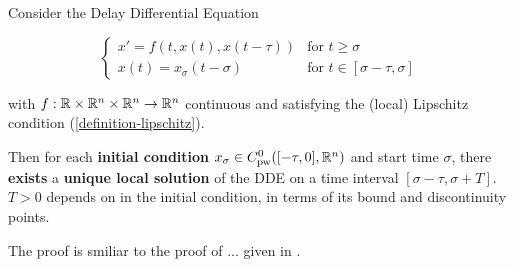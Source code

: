\documentclass[10pt]{article}
\begin{document}
\begin{theorem}
    \label{theorem-solution-existence}
    Consider the Delay Differential Equation



    \begin{equation}
        \begin{cases}
            x' = f(t,x(t),x(t-\tau)) & \text{for } t\geq\sigma\\
            x(t) = x_\sigma(t-\sigma)     & \text{for } t\in [\sigma-\tau,\sigma]
        \end{cases}
    \end{equation}

    with $f:\mathbb{R}\times\mathbb{R}^n\times\mathbb{R}^n\rightarrow\mathbb{R}^n$ continuous and satisfying the (local) Lipschitz condition (\ref{definition-lipschitz}).

    Then for each \textbf{initial condition} $x_\sigma\in C^0_\text{pw}([-\tau,0],\mathbb{R}^n)$ and start time $\sigma$, there \textbf{exists} a \textbf{unique local solution} of the DDE on a time interval $[\sigma-\tau, \sigma+T]$. $T>0$ depends on in the initial condition, in terms of its bound and discontinuity points.
\end{theorem}
The proof is smiliar to the proof of ... given in \cite{smith2010introDDE}.
\end{document}
